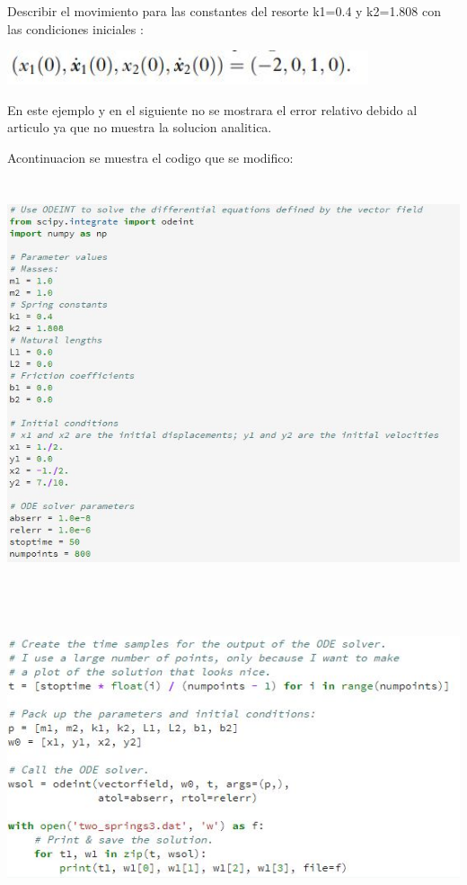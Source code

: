 \documentclass{article}
\begin{document}
Describir el movimiento para las constantes del resorte k1=0.4 y k2=1.808 con las condiciones iniciales :

\begin{center}
\includegraphics[height=1cm]{ec10.png}
\end{center}

En este ejemplo y en el siguiente no se mostrara el error relativo debido al articulo ya que no muestra la solucion analitica. 


Acontinuacion se muestra el codigo que se modifico:

\begin{center}
\includegraphics[height=12cm]{cod5.png}
\end{center}

\begin{center}
\includegraphics[height=9cm]{cod5_1.png}
\end{center}
\end{document}
